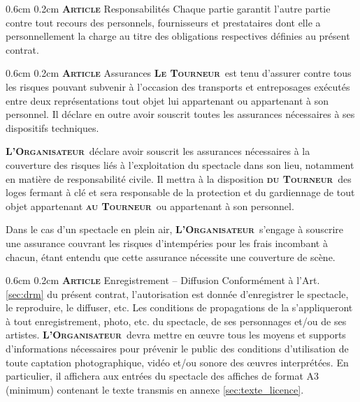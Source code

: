 \documentclass[a4paper,10pt]{article}
\makeatletter
\newcommand{\PR}{\textbf{\textsc{Le Tourneur}}}
\newcommand{\duPR}{\textbf{\textsc{du Tourneur}}}
\newcommand{\auPR}{\textbf{\textsc{au Tourneur}}}
\newcommand{\OR}{\textbf{\textsc{L'Organisateur}}}
\renewcommand\section{\@startsection{section}{1}{\z@}%
	{0.6cm}%
	{0.2cm}%
	{\noindent\large\bfseries\scshape Article }}
\makeatother
\begin{document}
\section{Responsabilit\'es}
\label{sec:resp}
Chaque partie garantit l'autre partie contre tout recours des
personnels, fournisseurs et prestataires dont elle a personnellement
la charge au titre des obligations respectives d\'efinies au pr\'esent
contrat.

\section{Assurances}
\label{sec:assurances}
\PR\ est tenu d'assurer contre tous les risques pouvant subvenir \`a
l'occasion des transports et entreposages ex\'ecut\'es entre deux
repr\'esentations tout objet lui appartenant ou appartenant \`a son
personnel. Il d\'eclare en outre avoir souscrit toutes les assurances
n\'ecessaires \`a ses dispositifs techniques.

\OR\ d\'eclare avoir souscrit les assurances n\'ecessaires \`a la
couverture des risques li\'es \`a l'exploitation du spectacle dans son
lieu, notamment en mati\`ere de responsabilit\'e civile. Il mettra \`a
la disposition \duPR\ des loges fermant \`a cl\'e et sera responsable
de la protection et du gardiennage de tout objet appartenant \auPR\ ou
appartenant \`a son personnel.

Dans le cas d'un spectacle en plein air, \OR\ s'engage \`a souscrire
une assurance couvrant les risques d'intemp\'eries pour les frais
incombant \`a chacun, \'etant entendu que cette assurance n\'ecessite
une couverture de sc\`ene.

\section{Enregistrement -- Diffusion}
\label{sec:enregistrement}
Conform\'ement \`a l'Art. \vref{sec:drm} du pr\'esent contrat,
l'autorisation est donn\'ee d'enregistrer le spectacle, le reproduire,
le diffuser, etc. Les conditions de propagations de la
\SpectacleLicenceLibreNom{} s'appliqueront \`a tout enregistrement,
photo, etc. du spectacle, de ses personnages et/ou de ses
artistes. \OR\ devra mettre en \oe uvre tous les moyens et supports
d'informations n\'ecessaires pour pr\'evenir le public des conditions
d'utilisation de toute captation photographique, vid\'eo et/ou sonore
des \oe uvres interpr\'et\'ees. En particulier, il affichera aux
entr\'ees du spectacle des affiches de format A3 (minimum) contenant
le texte transmis en annexe \vref{sec:texte_licence}.
\end{document}
